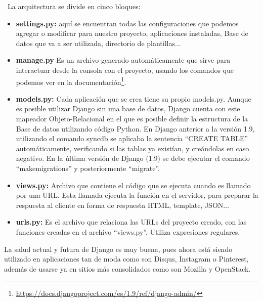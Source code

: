 \documentclass[a4paper, 12pt]{book}
\begin{document}
\ La arquitectura se divide en cinco bloques:

\begin{itemize}
\item\textbf{settings.py: }aquí se encuentran todas las configuraciones que podemos agregar o modificar para nuestro proyecto, aplicaciones instaladas, Base de datos que va a ser utilizada, directorio de plantillas...
\item\textbf{manage.py }Es un archivo generado automáticamente que sirve para interactuar desde la consola con el proyecto, usando los comandos que podemos ver en la documentación\footnote{\url{https://docs.djangoproject.com/es/1.9/ref/django-admin/}}.
\item\textbf{models.py: }Cada aplicación que se crea tiene su propio models.py. Aunque es posible utilizar Django sin una base de datos, Django cuenta con este mapeador Objeto-Relacional en el que es posible definir la estructura de la Base de datos utilizando código Python. En Django anterior a la versión 1.9, utilizando el comando syncdb se aplicaba la sentencia ``CREATE TABLE'' automáticamente, verificando si las tablas ya existían, y creándolas en caso negativo. En la última versión de Django (1.9) se debe ejecutar el comando ``makemigrations'' y posteriormente ``migrate''.
\item\textbf{views.py: }Archivo que contiene el código que se ejecuta cuando es llamado por una URL. Esta llamada ejecuta la función en el servidor, para preparar la respuesta al cliente en forma de respuesta HTML, template, JSON...  
\item\textbf{urls.py: }Es el archivo que relaciona las URLs del proyecto creado, con las funciones creadas en el archivo ``views.py''. Utiliza expresiones regulares.

\end{itemize}

La salud actual y futura de Django es muy buena, pues ahora está siendo utilizado en aplicaciones tan de moda como son Disqus, Instagram o Pinterest, además de usarse ya en sitios más consolidados como son Mozilla y OpenStack.\\
\end{document}
